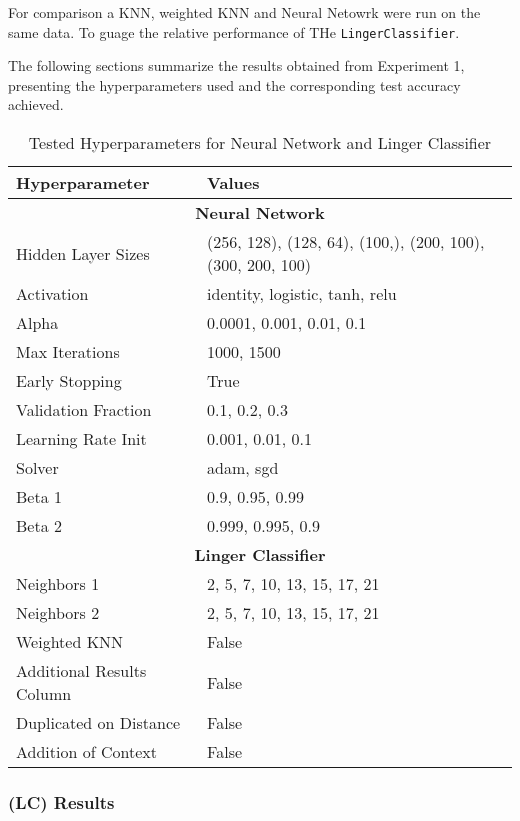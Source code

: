 \documentclass[a4paper, 12pt]{report}
\begin{document}
For comparison a KNN, weighted KNN and Neural Netowrk were run on the same data. To guage the relative performance of THe \texttt{LingerClassifier}.

The following sections summarize the results obtained from Experiment 1, presenting the hyperparameters used and the corresponding test accuracy achieved.

\begin{table}[H]
    \centering
    \caption{Tested Hyperparameters for Neural Network and Linger Classifier}
    \label{tab:hyperparameters}
    \begin{tabular}{|l|l|}
    \hline
    \textbf{Hyperparameter} & \textbf{Values} \\ \hline
    \multicolumn{2}{|c|}{\textbf{Neural Network}} \\ \hline
    Hidden Layer Sizes & (256, 128), (128, 64), (100,), (200, 100), (300, 200, 100) \\ \hline
    Activation & identity, logistic, tanh, relu \\ \hline
    Alpha & 0.0001, 0.001, 0.01, 0.1 \\ \hline
    Max Iterations & 1000, 1500 \\ \hline
    Early Stopping & True \\ \hline
    Validation Fraction & 0.1, 0.2, 0.3 \\ \hline
    Learning Rate Init & 0.001, 0.01, 0.1 \\ \hline
    Solver & adam, sgd \\ \hline
    Beta 1 & 0.9, 0.95, 0.99 \\ \hline
    Beta 2 & 0.999, 0.995, 0.9 \\ \hline
    \multicolumn{2}{|c|}{\textbf{Linger Classifier}} \\ \hline
    Neighbors 1 & 2, 5, 7, 10, 13, 15, 17, 21 \\ \hline
    Neighbors 2 & 2, 5, 7, 10, 13, 15, 17, 21 \\ \hline
    Weighted KNN & False \\ \hline
    Additional Results Column & False \\ \hline
    Duplicated on Distance & False \\ \hline
    Addition of Context & False \\ \hline
    \end{tabular}
\end{table}

\subsubsection{(LC) Results}
\end{document}
